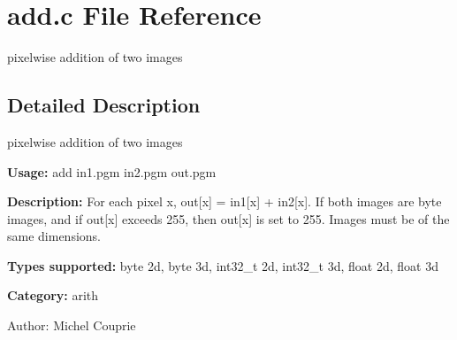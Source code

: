 \section{add.c File Reference}
\label{add_8c}
pixelwise addition of two images  




\label{_details}
\subsection{Detailed Description}
pixelwise addition of two images 

{\bf Usage:} add in1.pgm in2.pgm out.pgm

{\bf Description:} For each pixel x, out[x] = in1[x] + in2[x]. If both images are byte images, and if out[x] exceeds 255, then out[x] is set to 255. Images must be of the same dimensions.

{\bf Types supported:} byte 2d, byte 3d, int32\_\-t 2d, int32\_\-t 3d, float 2d, float 3d

{\bf Category:} arith

\begin{Desc}
\item[Author:]Michel Couprie \end{Desc}

